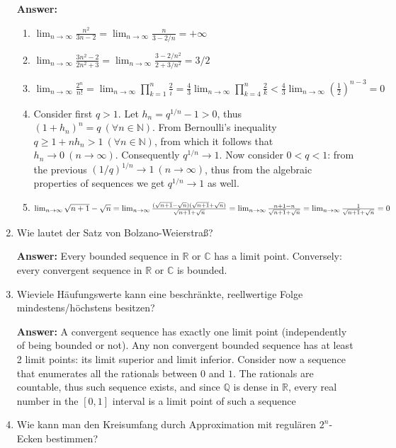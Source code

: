 \documentclass[11pt]{article}
\newcommand{\RR}[0]{\mathbb{R}}
\newcommand{\CC}[0]{\mathbb{C}}
\newcommand{\QQ}[0]{\mathbb{Q}}
\newcommand{\NN}[0]{\mathbb{N}}
\newcommand{\slim}[2]{\lim_{#1\to\infty}{#2}}
\begin{document}
\begin{enumerate}
    \textbf{Answer:}
    \begin{enumerate}
        \item $\lim_{n\to\infty}\frac{n^2}{3n - 2} = \lim_{n\to\infty}\frac{n}{3 - 2/n} = +\infty$
        \item $\lim_{n\to\infty}\frac{3n^2 - 2}{2n^2+3} = \lim_{n\to\infty}\frac{3 - 2/n^2}{2+3/n^2} = 3/2$
        \item $\lim_{n\to\infty}\frac{2^n}{n!} = \lim_{n\to\infty}\prod_{k=1}^n{\frac{2}{i}} = \frac{4}{3} \lim_{n\to\infty}\prod_{k=4}^n{\frac{2}{k}} < \frac{4}{3} \lim_{n\to\infty}{\left(\frac{1}{2}\right)}^{n-3} = 0 $
        \item Consider first $q>1$. Let $h_n = q^{1/n} - 1 > 0$, thus $(1+h_n)^n = q~(\forall n \in \NN)$. From Bernoulli's inequality $q \ge 1 + n h_n>1~(\forall n\in\NN)$, from which it follows that $h_n \to 0~(n\to\infty)$. Consequently $q^{1/n} \to 1$. Now consider $0 < q < 1$: from the previous $(1/q)^{1/n} \to 1~(n \to \infty)$, thus from the algebraic properties of sequences we get $q^{1/n} \to 1$ as well.
        \item $\lim_{n\to\infty} \sqrt{n+1} - \sqrt{n} = \lim_{n\to\infty} \frac{( \sqrt{n+1} - \sqrt{n})( \sqrt{n+1} + \sqrt{n})}{ \sqrt{n+1} + \sqrt{n}} = \lim_{n\to\infty}\frac{n+1 - n}{\sqrt{n+1} + \sqrt{n}} \\= \slim{n} {\frac{1}{\sqrt{n+1} + \sqrt{n}}} = 0$
    \end{enumerate}

    \item Wie lautet der Satz von Bolzano-Weierstraß?
    
    \textbf{Answer:} Every bounded sequence in $\RR$ or $\CC$ has a limit point. Conversely: every convergent sequence in $\RR$ or $\CC$ is bounded. 

    \item Wieviele Häufungswerte kann eine beschränkte, reellwertige Folge mindestens/höchstens besitzen?
    
    \textbf{Answer:} A convergent sequence has exactly one limit point (independently of being bounded or not). Any non convergent bounded sequence has at least 2 limit points: its limit superior and limit inferior. Consider now a sequence that enumerates all the rationals between $0$ and $1$. The rationals are countable, thus such sequence exists, and since $\QQ$ is dense in $\RR$, every real number in the $[0, 1]$ interval is a limit point of such a sequence

    \item Wie kann man den Kreisumfang durch Approximation mit regulären $2^n$-Ecken bestimmen?
    

\end{enumerate}
\end{document}
